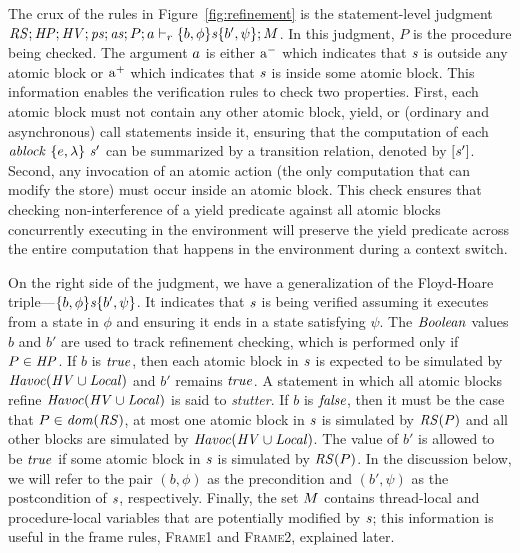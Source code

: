 The crux of the rules in Figure~\ref{fig:refinement} is the statement-level judgment 
$\mathit{RS};\mathit{HP};\mathit{HV};\mathit{ps};\mathit{as};P;a \vdash_r \{b, \phi\} \mathit{s} \{b', \psi\};M$.
In this judgment, $P$ is the procedure being checked.
The argument $a$ is either
$\mathrm{a^-}$ which indicates that $\mathit{s}$ is outside any atomic block or
$\mathrm{a^+}$ which indicates that $\mathit{s}$ is inside some atomic block.
This information enables the verification rules to check two properties.
First, each atomic block must not contain any other atomic block, yield, or (ordinary and asynchronous) call statements inside it,
ensuring that the computation of each $\mathit{ablock}\ {\{e,\lambda\}}\ {\mathit{s}'}$ can be summarized by a transition relation, denoted by $[\mathit{s}']$.
Second, any invocation of an atomic action (the only computation that can modify the store) must occur inside an atomic block.
This check ensures that checking non-interference of a yield predicate against all atomic blocks concurrently executing 
in the environment will preserve the yield predicate across the entire computation that happens in the environment during a context switch.

On the right side of the judgment, we have a generalization of the Floyd-Hoare triple---$\{b,\phi\} \mathit{s} \{b',\psi\}$.
It indicates that $\mathit{s}$ is being verified assuming it executes from a state in $\phi$ and ensuring it ends in a state satisfying $\psi$.
The $\mathit{Boolean}$ values $b$ and $b'$ are used to track refinement checking, which is performed only if $P \in \mathit{HP}$.
If $b$ is $\mathit{true}$, then each atomic block in $\mathit{s}$ is expected to be simulated by $\mathit{Havoc}(\mathit{HV} \cup \mathit{Local})$ and $b'$ remains $\mathit{true}$.
A statement in which all atomic blocks refine $\mathit{Havoc}(\mathit{HV} \cup \mathit{Local})$ is said to {\em stutter}.
If $b$ is $\mathit{false}$, then it must be the case that $P \in \mathit{dom}(\mathit{RS})$, at most one atomic block in $\mathit{s}$ is simulated by $\mathit{RS}(P)$
and all other blocks are simulated by $\mathit{Havoc}(\mathit{HV} \cup \mathit{Local})$.
The value of $b'$ is allowed to be $\mathit{true}$ if some atomic block in $\mathit{s}$ is simulated by $\mathit{RS}(P)$.
In the discussion below, we will refer to the pair $(b,\phi)$ as the precondition and $(b',\psi)$
as the postcondition of $\mathit{s}$, respectively.
Finally, the set $M$ contains thread-local and procedure-local variables that are potentially modified by $\mathit{s}$;
this information is useful in the frame rules, \textsc{Frame1} and \textsc{Frame2}, explained later.

